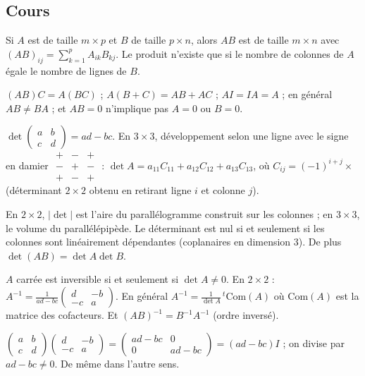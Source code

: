 \subsection{Cours}
\begin{definition}
Si $A$ est de taille $m\times p$ et $B$ de taille $p\times n$, alors $AB$ est de taille $m\times n$ avec $(AB)_{ij}=\sum_{k=1}^pA_{ik}B_{kj}$. Le produit n'existe que si le nombre de colonnes de $A$ égale le nombre de lignes de $B$.
\end{definition}
\begin{propriete}[Règles]
$(AB)C=A(BC)$ ; $A(B+C)=AB+AC$ ; $AI=IA=A$ ; en général $AB\ne BA$ ; et $AB=0$ n'implique pas $A=0$ ou $B=0$.
\end{propriete}
\begin{definition}[Déterminant]
$\det\begin{pmatrix}a&b\\c&d\end{pmatrix}=ad-bc$. En $3\times3$, développement selon une ligne avec le signe en damier $\begin{smallmatrix}+&-&+\\-&+&-\\+&-&+\end{smallmatrix}$ : $\det A=a_{11}C_{11}+a_{12}C_{12}+a_{13}C_{13}$, où $C_{ij}=(-1)^{i+j}\times$ (déterminant $2\times2$ obtenu en retirant ligne $i$ et colonne $j$).
\end{definition}
\begin{propriete}
En $2\times2$, $|\det|$ est l'aire du parallélogramme construit sur les colonnes ; en $3\times3$, le volume du parallélépipède. Le déterminant est nul si et seulement si les colonnes sont linéairement dépendantes (coplanaires en dimension 3). De plus $\det(AB)=\det A\det B$.
\end{propriete}
\begin{propriete}[Inverse]
$A$ carrée est inversible si et seulement si $\det A\ne0$. En $2\times2$ : $A^{-1}=\frac1{ad-bc}\begin{pmatrix}d&-b\\-c&a\end{pmatrix}$. En général $A^{-1}=\frac1{\det A}\,{}^t\mathrm{Com}(A)$ où $\mathrm{Com}(A)$ est la matrice des cofacteurs. Et $(AB)^{-1}=B^{-1}A^{-1}$ (ordre inversé).
\end{propriete}
\begin{demonstration}
$\begin{pmatrix}a&b\\c&d\end{pmatrix}\begin{pmatrix}d&-b\\-c&a\end{pmatrix}=\begin{pmatrix}ad-bc&0\\0&ad-bc\end{pmatrix}=(ad-bc)I$ ; on divise par $ad-bc\ne0$. De même dans l'autre sens.
\end{demonstration}
